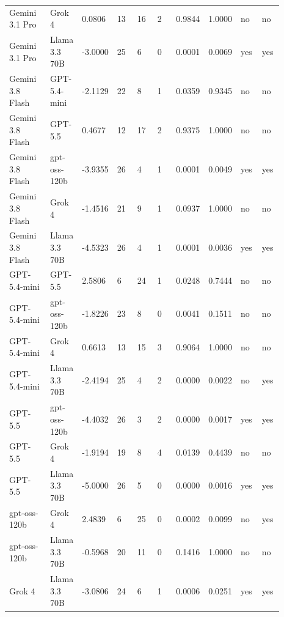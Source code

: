 \begin{landscape}
\begin{longtable}{p{0.162\linewidth}p{0.081\linewidth}p{0.081\linewidth}p{0.081\linewidth}p{0.081\linewidth}p{0.081\linewidth}p{0.081\linewidth}p{0.081\linewidth}p{0.081\linewidth}p{0.081\linewidth}}
Gemini 3.1 Pro & Grok 4 & 0.0806 & 13 & 16 & 2 & 0.9844 & 1.0000 & no & no \\
Gemini 3.1 Pro & Llama 3.3 70B & -3.0000 & 25 & 6 & 0 & 0.0001 & 0.0069 & yes & yes \\
Gemini 3.8 Flash & GPT-5.4-mini & -2.1129 & 22 & 8 & 1 & 0.0359 & 0.9345 & no & no \\
Gemini 3.8 Flash & GPT-5.5 & 0.4677 & 12 & 17 & 2 & 0.9375 & 1.0000 & no & no \\
Gemini 3.8 Flash & gpt-oss-120b & -3.9355 & 26 & 4 & 1 & 0.0001 & 0.0049 & yes & yes \\
Gemini 3.8 Flash & Grok 4 & -1.4516 & 21 & 9 & 1 & 0.0937 & 1.0000 & no & no \\
Gemini 3.8 Flash & Llama 3.3 70B & -4.5323 & 26 & 4 & 1 & 0.0001 & 0.0036 & yes & yes \\
GPT-5.4-mini & GPT-5.5 & 2.5806 & 6 & 24 & 1 & 0.0248 & 0.7444 & no & no \\
GPT-5.4-mini & gpt-oss-120b & -1.8226 & 23 & 8 & 0 & 0.0041 & 0.1511 & no & no \\
GPT-5.4-mini & Grok 4 & 0.6613 & 13 & 15 & 3 & 0.9064 & 1.0000 & no & no \\
GPT-5.4-mini & Llama 3.3 70B & -2.4194 & 25 & 4 & 2 & 0.0000 & 0.0022 & no & yes \\
GPT-5.5 & gpt-oss-120b & -4.4032 & 26 & 3 & 2 & 0.0000 & 0.0017 & yes & yes \\
GPT-5.5 & Grok 4 & -1.9194 & 19 & 8 & 4 & 0.0139 & 0.4439 & no & no \\
GPT-5.5 & Llama 3.3 70B & -5.0000 & 26 & 5 & 0 & 0.0000 & 0.0016 & yes & yes \\
gpt-oss-120b & Grok 4 & 2.4839 & 6 & 25 & 0 & 0.0002 & 0.0099 & no & yes \\
gpt-oss-120b & Llama 3.3 70B & -0.5968 & 20 & 11 & 0 & 0.1416 & 1.0000 & no & no \\
Grok 4 & Llama 3.3 70B & -3.0806 & 24 & 6 & 1 & 0.0006 & 0.0251 & yes & yes \\
\bottomrule
\end{longtable}
\normalsize
\end{landscape}

